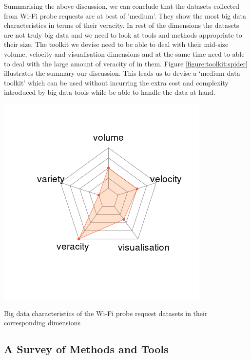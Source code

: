 Summarising the above discussion, we can conclude that the datasets collected from Wi-Fi probe requests are at best of 'medium'.
They show the most big data characteristics in terms of their veracity.
In rest of the dimensions the datasets are not truly big data and we need to look at tools and methods appropriate to their size.
The toolkit we devise need to be able to deal with their mid-size volume, velocity and visualisation dimensions and at the same time need to able to deal with the large amount of veracity of in them.
Figure \ref{figure:toolkit:spider} illustrates the summary our discussion.
This leads us to devise a `medium data toolkit' which can be used without incurring the extra cost and complexity introduced by big data tools while be able to handle the data at hand.

\begin{marginfigure}
  \includegraphics[trim={2.1cm 0 0 0},clip]{images/data-toolkit-spider.png}
  \caption{Big data characteristics of the Wi-Fi probe request datasets in their corresponding dimensions}
  \label{figure:toolkit:spider}
\end{marginfigure}


\subsection{A Survey of Methods and Tools}

